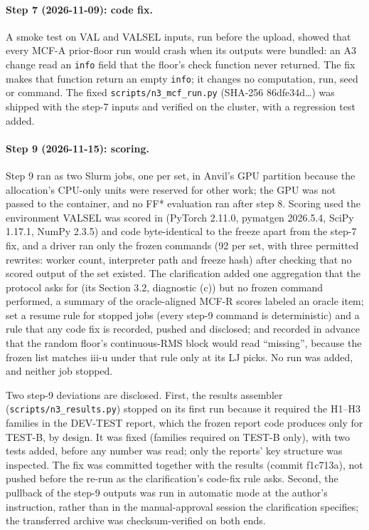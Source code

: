 \paragraph{Step 7 (2026-11-09): code fix.} A smoke test on VAL and VALSEL inputs,
run before the upload, showed that every MCF-A prior-floor run would crash when its
outputs were bundled: an A3 change read an \texttt{info} field that the floor's
check function never returned. The fix makes that function return an empty
\texttt{info}; it changes no computation, run, seed or command. The fixed
\texttt{scripts/n3\_mcf\_run.py} (SHA-256 86dfe34d\ldots) was shipped with the
step-7 inputs and verified on the cluster, with a regression test added.

\paragraph{Step 9 (2026-11-15): scoring.} Step 9 ran as two Slurm jobs, one per
set, in Anvil's GPU partition because the allocation's CPU-only units were reserved
for other work; the GPU was not passed to the container, and no FF* evaluation ran
after step 8. Scoring used the environment VALSEL was scored in (PyTorch 2.11.0,
pymatgen 2026.5.4, SciPy 1.17.1, NumPy 2.3.5) and code byte-identical to the
freeze apart from the step-7 fix, and a driver ran only the frozen commands (92 per
set, with three permitted rewrites: worker count, interpreter path and freeze hash)
after checking that no scored output of the set existed. The clarification added
one aggregation that the protocol asks for (its Section 3.2, diagnostic (c)) but no
frozen command performed, a summary of the oracle-aligned MCF-R scores labeled an
oracle item; set a resume rule for stopped jobs (every step-9 command is
deterministic) and a rule that any code fix is recorded, pushed and disclosed; and
recorded in advance that the random floor's continuous-RMS block would read
``missing'', because the frozen list matches iii-u under that rule only at its LJ
picks. No run was added, and neither job stopped.

Two step-9 deviations are disclosed. First, the results assembler
(\texttt{scripts/n3\_results.py}) stopped on its first run because it required the
H1--H3 families in the DEV-TEST report, which the frozen report code produces only
for TEST-B, by design. It was fixed (families required on TEST-B only), with two
tests added, before any number was read; only the reports' key structure was
inspected. The fix was committed together with the results (commit f1c713a), not
pushed before the re-run as the clarification's code-fix rule asks. Second, the
pullback of the step-9 outputs was run in automatic mode at the author's
instruction, rather than in the manual-approval session the clarification
specifies; the transferred archive was checksum-verified on both ends.

